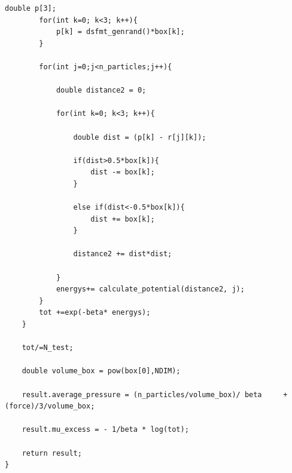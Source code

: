 \begin{lstlisting}[style=Cstyle]
		double p[3];
		for(int k=0; k<3; k++){
			p[k] = dsfmt_genrand()*box[k];
		}
		
		for(int j=0;j<n_particles;j++){
			
			double distance2 = 0;
			
			for(int k=0; k<3; k++){
				
				double dist = (p[k] - r[j][k]);
				
				if(dist>0.5*box[k]){
					dist -= box[k];
				}
				
				else if(dist<-0.5*box[k]){
					dist += box[k];
				}
				
				distance2 += dist*dist;
				
			}
			energys+= calculate_potential(distance2, j);
		}
		tot +=exp(-beta* energys);
	}
	
	tot/=N_test;
	
	double volume_box = pow(box[0],NDIM);
	
	result.average_pressure = (n_particles/volume_box)/ beta     + (force)/3/volume_box;
	
	result.mu_excess = - 1/beta * log(tot); 
	
	return result;
}

\end{lstlisting}